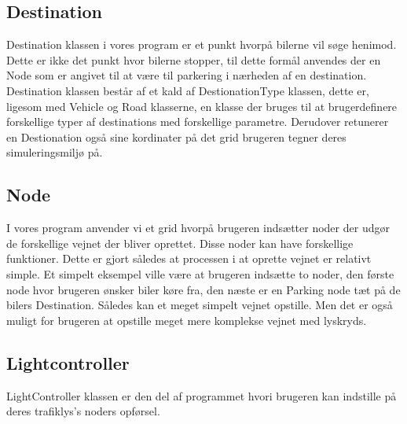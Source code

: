 \subsection{Destination}
Destination klassen i vores program er et punkt hvorpå bilerne vil søge henimod. Dette er ikke det punkt hvor bilerne stopper, til dette formål anvendes der en Node som er angivet til at være til parkering i nærheden af en destination. Destination klassen består af et kald af DestionationType klassen, dette er, ligesom med Vehicle og Road klasserne, en klasse der bruges til at brugerdefinere forskellige typer af destinations med forskellige parametre. Derudover retunerer en Destionation også sine kordinater på det grid brugeren tegner deres simuleringsmiljø på.

\subsection{Node}
I vores program anvender vi et grid hvorpå brugeren indsætter noder der udgør de forskellige vejnet der bliver oprettet. Disse noder kan have forskellige funktioner. Dette er gjort således at processen i at oprette vejnet er relativt simple. Et simpelt eksempel ville være at brugeren indsætte to noder, den første node hvor brugeren ønsker biler køre fra, den næste er en Parking node tæt på de bilers Destination. Således kan et meget simpelt vejnet opstille. Men det er også muligt for brugeren at opstille meget mere komplekse vejnet med lyskryds.



\subsection{Lightcontroller}
LightController klassen er den del af programmet hvori brugeren kan indstille på deres trafiklys's noders opførsel.

